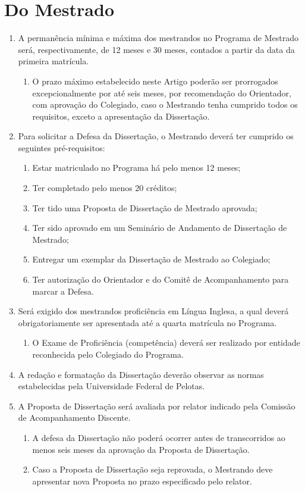 \documentclass{article}
\newcommand{\singleitem}{\item[Parágrafo Único.]}
\begin{document}
\section{Do Mestrado}
\begin{enumerate}
	\item A permanência mínima e máxima dos mestrandos no Programa de Mestrado será, respectivamente, de 12 meses e 30 meses, contados a partir da data da primeira matrícula.
	\begin{enumerate}
		\singleitem O prazo máximo estabelecido neste Artigo poderão ser prorrogados excepcionalmente por até seis meses, por recomendação do Orientador, com aprovação do Colegiado, caso o Mestrando tenha cumprido todos os requisitos, exceto a apresentação da Dissertação.
	\end{enumerate}

	\item Para solicitar a Defesa da Dissertação, o Mestrando deverá ter cumprido os seguintes pré-requisitos:
	\begin{enumerate}[label=\Roman*]
		\item 	Estar matriculado no Programa há pelo menos 12 meses;
		\item 	Ter completado pelo menos 20 créditos;
		\item 	Ter tido uma Proposta de Dissertação de Mestrado aprovada;
		\item 	Ter sido aprovado em um Seminário de Andamento de Dissertação de Mestrado;
		\item 	Entregar um exemplar da Dissertação de Mestrado ao Colegiado;
		\item 	Ter autorização do Orientador e do Comitê de Acompanhamento para marcar a Defesa.
	\end{enumerate}

	\item Será exigido dos mestrandos proficiência em Língua Inglesa, a qual deverá obrigatoriamente ser apresentada até a quarta matrícula no Programa.
	\begin{enumerate}
		\singleitem O Exame de Proficiência (competência) deverá ser realizado por entidade reconhecida pelo Colegiado do Programa.
	\end{enumerate}

	\item A redação e formatação da Dissertação deverão observar as normas estabelecidas pela Universidade Federal de Pelotas.

	\item A Proposta de Dissertação será avaliada por relator indicado pela Comissão de Acompanhamento Discente.
	\begin{enumerate}
		\item A defesa da Dissertação não poderá ocorrer antes de transcorridos ao menos seis meses da aprovação da Proposta de Dissertação.
		\item Caso a Proposta de Dissertação seja reprovada, o Mestrando deve apresentar nova Proposta no prazo especificado pelo relator.
	\end{enumerate}


\end{enumerate}
\end{document}
